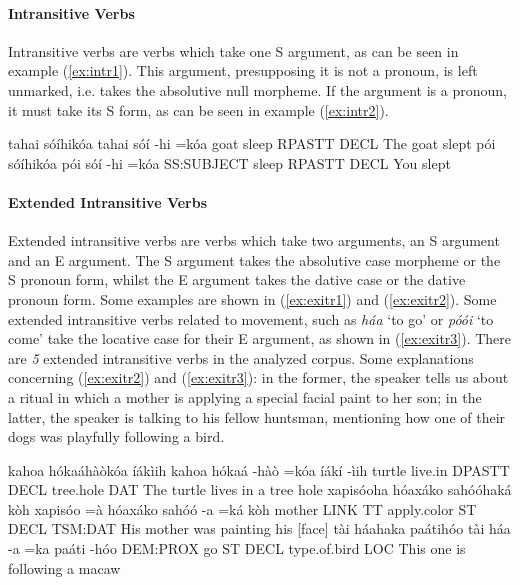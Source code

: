 \documentclass[a4paper, 12pt, oneside]{memoir}
\newcommand{\emh}[1]{\textit{#1}}
\begin{document}
\paragraph{Intransitive Verbs}
Intransitive verbs are verbs which take one S argument, as can be seen in example (\ref{ex:intr1}). This argument, presupposing it is not a pronoun, is left unmarked, i.e. takes the absolutive null morpheme. If the argument is a pronoun, it must take its S form, as can be seen in example (\ref{ex:intr2}).
\begin{examples}
    \ex \label{ex:intr1}
    \words tahai sóíhikóa
    \bits tahai sóí -hi =kóa
    \gloss goat sleep RPASTT DECL
    \tr The goat slept
    \ex \label{ex:intr2}
    \words pói sóíhikóa
    \bits pói sóí -hi =kóa
    \gloss SS:SUBJECT sleep RPASTT DECL 
    \tr You slept
\end{examples}
\paragraph{Extended Intransitive Verbs}
Extended intransitive verbs are verbs which take two arguments, an S argument and an E argument. The S argument takes the absolutive case morpheme or the S pronoun form, whilst the E argument takes the dative case or the dative pronoun form. Some examples are shown in (\ref{ex:exitr1}) and (\ref{ex:exitr2}). Some extended intransitive verbs related to movement, such as \emh{háa} `to go' or \emh{póói} `to come' take the locative case for their E argument, as shown in (\ref{ex:exitr3}). There are \textit{5} extended intransitive verbs in the analyzed corpus. Some explanations concerning (\ref{ex:exitr2}) and (\ref{ex:exitr3}): in the former, the speaker tells us about a ritual in which a mother is applying a special facial paint to her son; in the latter, the speaker is talking to his fellow huntsman, mentioning how one of their dogs was playfully following a bird.
\begin{examples}
    \ex \label{ex:exitr1} 
    \words kahoa hókaáhàòkóa íákìih
    \bits kahoa hókaá -hàò =kóa íákí -ìih 
    \gloss turtle live.in DPASTT DECL tree.hole DAT
    \tr The turtle lives in a tree hole
    \ex \label{ex:exitr2}
    \words xapisóoha hóaxáko sahóóhaká kòh
    \bits xapisóo =à hóaxáko sahóó -a =ká kòh
    \gloss mother LINK TT apply.color ST DECL TSM:DAT
    \tr His mother was painting his [face]
    \ex \label{ex:exitr3}
    \words tài háahaka paátihóo
    \bits  tài háa -a =ka paáti -hóo 
    \gloss DEM:PROX go ST DECL type.of.bird LOC
    \tr This one is following a macaw
\end{examples}
\end{document}
